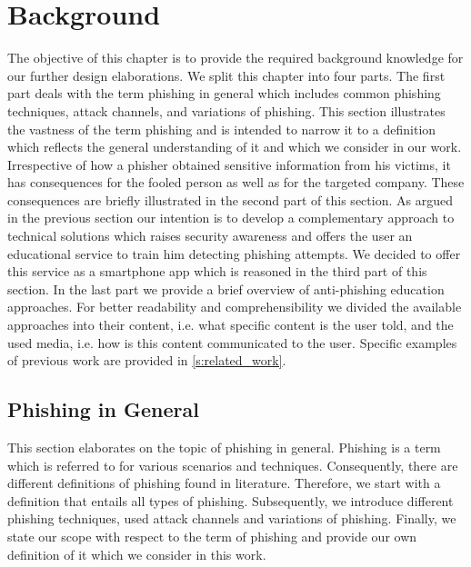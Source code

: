 \section{Background}
\label{s:background}
The objective of this chapter is to provide the required background knowledge for our further design elaborations. 
We split this chapter into four parts.
The first part deals with the term phishing in general which includes common phishing techniques, attack channels, and variations of phishing.
This section illustrates the vastness of the term phishing and is intended to narrow it to a definition which reflects the general understanding of it and which we consider in our work.
Irrespective of how a phisher obtained sensitive information from his victims, it has consequences for the fooled person as well as for the targeted company.
These consequences are briefly illustrated in the second part of this section.
As argued in the previous section our intention is to develop a complementary approach to technical solutions which raises security awareness and offers the user an educational service to train him detecting phishing attempts.
We decided to offer this service as a smartphone app which is reasoned in the third part of this section.
In the last part we provide a brief overview of anti-phishing education approaches.
For better readability and comprehensibility we divided the available approaches into their content, i.e. what specific content is the user told, and the used media, i.e. how is this content communicated to the user. Specific examples of previous work are provided in \autoref{s:related_work}.

\subsection{Phishing in General}
\label{s:phishing_general}
This section elaborates on the topic of phishing in general.
Phishing is a term which is referred to for various scenarios and techniques.
Consequently, there are different definitions of phishing found in literature.
Therefore, we start with a definition that entails all types of phishing.
Subsequently, we introduce different phishing techniques, used attack channels and variations of phishing.
Finally, we state our scope with respect to the term of phishing and provide our own definition of it which we consider in this work.
